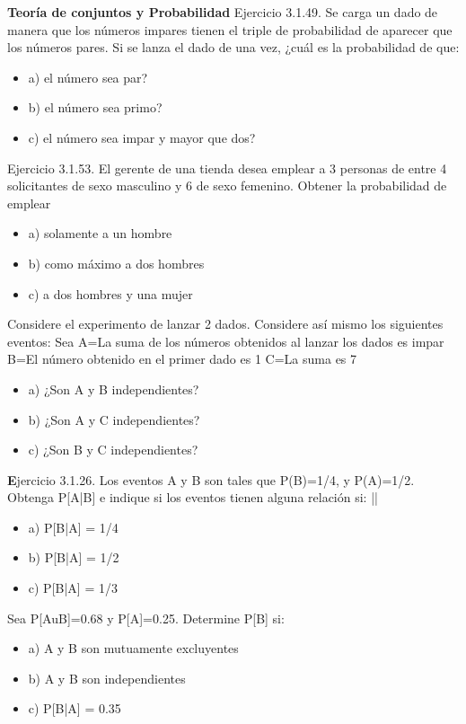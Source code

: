 \documentclass{oxmathproblems}
\begin{document}
\begin{questions}

\miquestion \textbf{Teoría de conjuntos y Probabilidad} Ejercicio 3.1.49. Se carga un dado de manera que los números impares tienen el triple de probabilidad de aparecer que  los números pares. Si se lanza el dado de una vez, ¿cuál es la probabilidad de que: 
\begin{itemize}
\item  a) el número sea par?
\item  b) el número sea primo?
\item  c) el número sea impar y mayor que dos?
\end{itemize}

\miquestion Ejercicio 3.1.53. El gerente de una tienda desea emplear a 3 personas de entre 4 solicitantes de sexo masculino y 6 de sexo femenino. Obtener la probabilidad de emplear 
\begin{itemize}
\item  a) solamente a un hombre
\item  b) como máximo a dos hombres
\item  c) a dos hombres y una  mujer
\end{itemize}

\miquestion Considere el experimento de lanzar 2 dados. Considere así mismo los siguientes eventos: Sea 
A={La suma de los números obtenidos al lanzar los dados es impar}
B={El número obtenido en el primer dado es 1}
C={La suma es 7}
\begin{itemize}
 \item a) ¿Son A y B independientes?
\item b) ¿Son A y C independientes?
\item c) ¿Son B y C independientes?
\end{itemize}
\miquestion \textbf 
Ejercicio 3.1.26. Los eventos A y B son tales que P(B)=1/4, y P(A)=1/2. Obtenga P[A|B] e indique si los eventos tienen alguna relación si: ||
\begin{itemize}
 \item a) P[B|A] = 1/4
 \item b) P[B|A] = 1/2
 \item  c) P[B|A] = 1/3
\end{itemize}

\miquestion Sea P[AuB]=0.68 y P[A]=0.25. Determine P[B] si: 
\begin{itemize}
 \item a) A y B son mutuamente excluyentes 
 \item b) A y B son independientes
 \item  c) P[B|A] = 0.35 
\end{itemize}


\end{questions}
\end{document}
